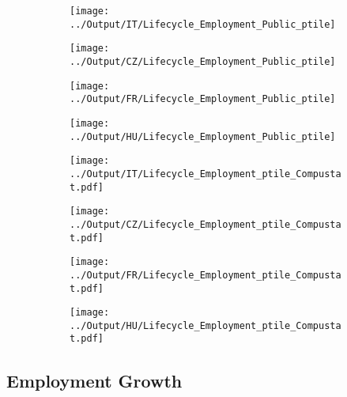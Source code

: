 \documentclass[12pt,notitlepage]{article}
\begin{document}
\begin{figure}[!htpb]
\centering
\caption{Employment Percentiles by Year (Public Firms in Orbis)}
\begin{subfigure}{.49\textwidth}
    \centering
 \texttt{[image: ../Output/IT/Lifecycle\_Employment\_Public\_ptile]}
\end{subfigure}%
\begin{subfigure}{.49\textwidth}
    \centering
 \texttt{[image: ../Output/CZ/Lifecycle\_Employment\_Public\_ptile]}
\end{subfigure}
\begin{subfigure}{.49\textwidth}
    \centering
 \texttt{[image: ../Output/FR/Lifecycle\_Employment\_Public\_ptile]}
\end{subfigure}%
\begin{subfigure}{.49\textwidth}
    \centering
 \texttt{[image: ../Output/HU/Lifecycle\_Employment\_Public\_ptile]}
\end{subfigure}
\end{figure}
\pagebreak


\begin{figure}[!htpb]
\centering
\caption{Employment Percentiles by Year (Public Firms in Compustat)}
\begin{subfigure}{.49\textwidth}
    \centering
 \texttt{[image: ../Output/IT/Lifecycle\_Employment\_ptile\_Compustat.pdf]}
\end{subfigure}%
\begin{subfigure}{.49\textwidth}
    \centering
 \texttt{[image: ../Output/CZ/Lifecycle\_Employment\_ptile\_Compustat.pdf]}
\end{subfigure}
\begin{subfigure}{.49\textwidth}
    \centering
 \texttt{[image: ../Output/FR/Lifecycle\_Employment\_ptile\_Compustat.pdf]}
\end{subfigure}%
\begin{subfigure}{.49\textwidth}
    \centering
 \texttt{[image: ../Output/HU/Lifecycle\_Employment\_ptile\_Compustat.pdf]}
\end{subfigure}
\end{figure}
\pagebreak



\subsection{Employment Growth} %
\label{sec:employment_growth}
\end{document}
